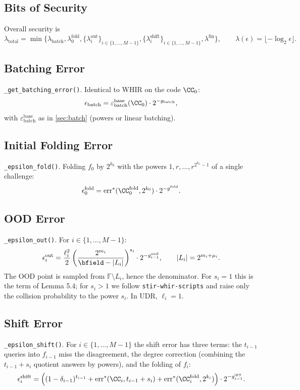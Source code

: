 \subsection{Bits of Security}

Overall security is
\[
  \lambda_{\mathrm{total}}
    = \min\{
      \lambda_{\mathrm{batch}},
      \lambda^{\mathrm{fold}}_{0},
      \{\lambda^{\mathrm{out}}_i\}_{i\in \{1,\ldots,M-1\}},
      \{\lambda^{\mathrm{shift}}_i\}_{i\in \{1,\ldots,M-1\}},
      \lambda^{\mathrm{fin}}
    \},
  \qquad \lambda(\epsilon) = \lfloor -\log_2 \epsilon \rfloor.
\]

\subsection{Batching Error}
\verb|_get_batching_error()|. Identical to WHIR on the code $\CC_0$:
\[
  \epsilon_{\mathrm{batch}} = \varepsilon^{\mathrm{base}}_{\mathrm{batch}}(\CC_0) \cdot 2^{-g_{\mathrm{batch}}},
\]
with $\varepsilon^{\mathrm{base}}_{\mathrm{batch}}$ as in \cref{sec:batch} (powers or linear batching).

\subsection{Initial Folding Error}
\verb|_epsilon_fold()|. Folding $f_0$ by $2^{k_0}$ with the powers $1, r, \ldots, r^{2^{k_0}-1}$ of a single challenge:
\[
  \epsilon^{\mathrm{fold}}_0 = \operatorname{err}^*(\CC_0^{\mathrm{fold}}, 2^{k_0}) \cdot 2^{-g^{\mathrm{fold}}}.
\]

\subsection{OOD Error}
\verb|_epsilon_out()|. For $i \in \{1,\ldots,M-1\}$:
\[
  \epsilon^{\mathrm{out}}_i = \frac{\ell_i^2}{2} \left(\frac{2^{m_i}}{\bfield - |L_i|}\right)^{s_i} \cdot 2^{-g^{\mathrm{ood}}_{i-1}},
  \qquad |L_i| = 2^{m_i + \mu_i}.
\]
The OOD point is sampled from $\mathbb{F} \setminus L_i$, hence the denominator. For $s_i = 1$ this is the term of Lemma 5.4; for $s_i > 1$ we follow \texttt{stir-whir-scripts} and raise only the collision probability to the power $s_i$. In UDR, $\ell_i = 1$.

\subsection{Shift Error}
\verb|_epsilon_shift()|. For $i \in \{1,\ldots,M-1\}$ the shift error has three terms: the $t_{i-1}$ queries into $f_{i-1}$ miss the disagreement, the degree correction (combining the $t_{i-1}+s_{i}$ quotient answers by powers), and the folding of $f_i$:
\[
  \epsilon^{\mathrm{shift}}_i
    = \Big( (1-\delta_{i-1})^{t_{i-1}}
      + \operatorname{err}^*(\CC_i, t_{i-1} + s_i)
      + \operatorname{err}^*(\CC_i^{\mathrm{fold}}, 2^{k_i}) \Big) \cdot 2^{-g^{\mathrm{qry}}_{i-1}}.
\]

